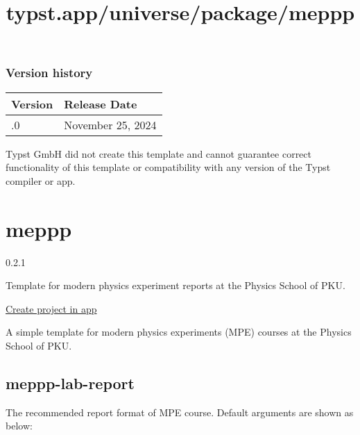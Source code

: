 \subsubsection{Version history}\label{version-history}

\begin{longtable}[]{@{}ll@{}}
\toprule\noalign{}
Version & Release Date \\
\midrule\noalign{}
\endhead
\bottomrule\noalign{}
\endlastfoot
0.1.0 & November 25, 2024 \\
\end{longtable}

Typst GmbH did not create this template and cannot guarantee correct
functionality of this template or compatibility with any version of the
Typst compiler or app.


\title{typst.app/universe/package/meppp}

\label{banner}
\label{template-thumbnail}

\section{meppp}\label{meppp}

{ 0.2.1 }

Template for modern physics experiment reports at the Physics School of
PKU.

\href{/app?template=meppp&version=0.2.1}{Create project in app}

\label{readme}
A simple template for modern physics experiments (MPE) courses at the
Physics School of PKU.

\subsection{meppp-lab-report}\label{meppp-lab-report}

The recommended report format of MPE course. Default arguments are shown
as below:

\begin{Shaded}
\begin{Highlighting}[]

\end{Highlighting}
\end{Shaded}


